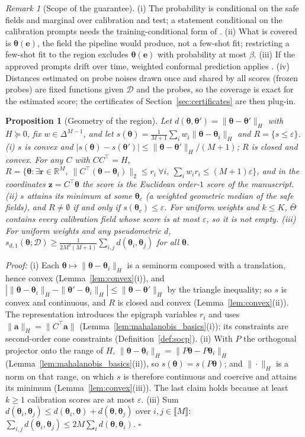 \documentclass{article}
\newcommand{\RR}{\mathbb{R}}
\newcommand{\cD}{\mathcal{D}}
\newcommand{\bth}{\boldsymbol{\theta}}
\newcommand{\ba}{\mathbf{a}}
\newcommand{\be}{\mathbf{e}}
\newcommand{\Tbar}{\bar{\Theta}}
\theoremstyle{plain}
\newtheorem{proposition}[theorem]{Proposition}
\theoremstyle{remark}
\newtheorem{remark}[theorem]{Remark}
\begin{document}
\begin{remark}[Scope of the guarantee]\label{rem:scope}
(i) The probability is conditional on the safe fields and marginal over calibration and test; a
statement conditional on the calibration prompts needs the training-conditional form of
\citet{vovk2013conditional}. (ii) What is covered is $\bth(\be)$, the field the pipeline would
produce, not a few-shot fit; restricting a few-shot fit to the region excludes $\bth(\be)$ with
probability at most $\beta$. (iii) If the approved prompts drift over time, weighted conformal
prediction applies \citep{barber2023conformal}. (iv) Distances estimated on probe noises drawn
once and shared by all scores (frozen probes) are fixed functions given $\cD$ and the probes, so
the coverage is exact for the estimated score; the certificates of Section~\ref{sec:certificates}
are then plug-in.
\end{remark}

\begin{proposition}[Geometry of the region]\label{pr:geometry}
Let $d(\bth,\bth')=\|\bth-\bth'\|_H$ with $H\succeq0$, fix $w\in\Delta^{M-1}$, and let
$s(\bth)=\frac{1}{M+1}\sum_iw_i\|\bth-\bth_i\|_H$ and $R=\{s\le\varepsilon\}$.
(i) $s$ is convex and $|s(\bth)-s(\bth')|\le\|\bth-\bth'\|_H/(M+1)$; $R$ is closed and convex. For any $C$ with
$CC^\top=H$, $R=\{\bth:\exists\mathbf r\in\RR^M,\ \|C^\top(\bth-\bth_i)\|_2\le r_i\ \forall i,\ \sum_iw_ir_i\le(M+1)\varepsilon\}$,
and in the coordinates $\mathbf z=C^\top\bth$ the score is the Euclidean order-$1$ score of the manuscript.
(ii) $s$ attains its minimum at some $\bth_c$ (a weighted geometric median of the safe fields), and
$R\ne\emptyset$ if and only if $s(\bth_c)\le\varepsilon$. For uniform weights and $k\le K$, $\Tbar$ contains every
calibration field whose score is at most $\varepsilon$, so it is not empty.
(iii) For uniform weights and any pseudometric $d$,
$s_{d,1}(\bth;\cD)\ge\frac{1}{2M^2(M+1)}\sum_{i,j}d(\bth_i,\bth_j)$ for all $\bth$.
\end{proposition}
\textit{Proof:}
(i) Each $\bth\mapsto\|\bth-\bth_i\|_H$ is a seminorm composed with a translation, hence convex (Lemma~\ref{lem:convex}(i)), and
$|\|\bth-\bth_i\|_H-\|\bth'-\bth_i\|_H|\le\|\bth-\bth'\|_H$ by the triangle inequality; so $s$ is convex and continuous, and $R$ is closed and
convex (Lemma~\ref{lem:convex}(ii)). The representation introduces the epigraph variables $r_i$ and uses $\|\ba\|_H=\|C^\top\ba\|$
(Lemma~\ref{lem:mahalanobis_basics}(i)); its constraints are second-order cone constraints (Definition~\ref{def:socp}).
(ii) With $P$ the orthogonal projector onto the range of $H$, $\|\bth-\bth_i\|_H=\|P\bth-P\bth_i\|_H$ (Lemma~\ref{lem:mahalanobis_basics}(ii)), so
$s(\bth)=s(P\bth)$; and $\|\cdot\|_H$ is a norm on that range, on which $s$ is therefore continuous and coercive and attains its minimum
(Lemma~\ref{lem:convex}(iii)). The last claim holds because at least $k\ge1$ calibration scores are at most $\varepsilon$.
(iii) Sum $d(\bth_i,\bth_j)\le d(\bth_i,\bth)+d(\bth,\bth_j)$ over $i,j\in\llbracket M\rrbracket$:
$\sum_{i,j}d(\bth_i,\bth_j)\le2M\sum_id(\bth,\bth_i)$. \hfill$\square$
\end{document}
